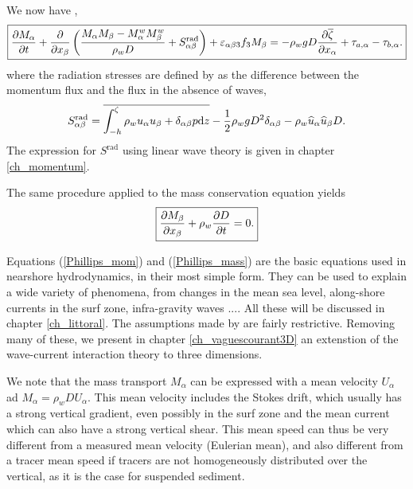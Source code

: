 We now have \citep{Smith2006b}, 
\begin{equation}
\fbox{$\displaystyle \frac{\partial M_\alpha }{\partial t} + \frac{\partial }{\partial x_\beta} \left( \frac{M_\alpha M_\beta-M_\alpha^w M_\beta^w}{\rho_w D} 
+ S^{\mathrm{rad}}_{\alpha \beta}\right) +\varepsilon_{\alpha \beta 3} f_3 M_\beta  = -\rho_w g D \frac{\partial \overline{\zeta}}{\partial x_\alpha} + \tau_{a,\alpha} - \tau_{b,\alpha}.$}\label{Phillips_mom}
\end{equation}
where the radiation stresses are defined by \cite{Phillips1977} as the difference between the momentum flux and the flux in the absence of waves, 
\begin{equation}
    S^{\mathrm{rad}}_{\alpha \beta}=\overline{\int_{-h}^\zeta \rho_w u_\alpha u_\beta +\delta_{\alpha \beta}  p \mathrm{d}z }
    -\frac{1}{2} \rho_w g D^2 \delta_{\alpha \beta}  - \rho_w \widehat{u}_\alpha \widehat{u}_\beta D. \label{Srad_def_Phillips}
\end{equation}
The expression for $S^{\mathrm{rad}}$ using linear wave theory is given in chapter \ref{ch_momentum}.

The same procedure applied to the mass conservation equation yields 
\begin{equation}
\fbox{$\displaystyle \frac{\partial M_\beta }{\partial x_\beta} + \rho_w \frac{\partial D}{\partial t}=0.$}\label{Phillips_mass}
\end{equation}

Equations (\ref{Phillips_mom}) and (\ref{Phillips_mass}) are the basic equations used in nearshore hydrodynamics, in their most 
simple form. They can be used to explain a wide variety of phenomena, from changes in the mean sea level, along-shore currents in the 
surf zone, infra-gravity waves ....  All these will be discussed in chapter \ref{ch_littoral}. The assumptions made by 
 \cite{Phillips1977} are fairly restrictive. Removing many of these, we present in chapter \ref{ch_vaguescourant3D} an extenstion of the wave-current interaction theory to three dimensions. 

We note that the mass transport $M_\alpha$ can be expressed with a mean velocity $U_\alpha$ ad $M_\alpha=\rho_w D U_\alpha$. 
This mean velocity includes the Stokes drift, which usually has a strong vertical gradient, even possibly in the surf zone  \citep{Ardhuin&al.2008}
and the mean current which can also have a strong vertical shear. 
This mean speed can thus be very different from a measured mean velocity (Eulerian mean), 
and also different from a tracer mean speed if tracers are not homogeneously 
distributed over the vertical, as it is the case for suspended sediment. 




